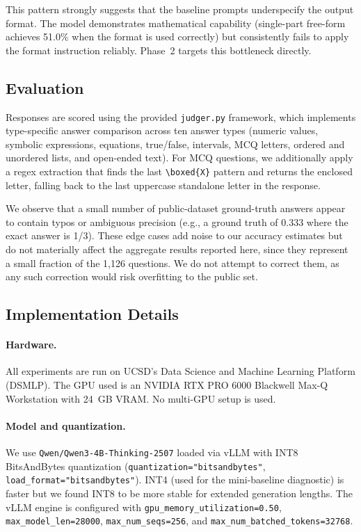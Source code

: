 \documentclass{article}
\begin{document}
This pattern strongly suggests that the baseline prompts underspecify the output format. The model demonstrates mathematical capability (single-part free-form achieves 51.0\% when the format is used correctly) but consistently fails to apply the format instruction reliably. Phase~2 targets this bottleneck directly.


\subsection{Evaluation}
\label{sec:evaluation}

Responses are scored using the provided \texttt{judger.py} framework, which implements type-specific answer comparison across ten answer types (numeric values, symbolic expressions, equations, true/false, intervals, MCQ letters, ordered and unordered lists, and open-ended text). For MCQ questions, we additionally apply a regex extraction that finds the last \texttt{\textbackslash boxed\{X\}} pattern and returns the enclosed letter, falling back to the last uppercase standalone letter in the response.

We observe that a small number of public-dataset ground-truth answers appear to contain typos or ambiguous precision (e.g., a ground truth of 0.333 where the exact answer is 1/3). These edge cases add noise to our accuracy estimates but do not materially affect the aggregate results reported here, since they represent a small fraction of the 1,126 questions. We do not attempt to correct them, as any such correction would risk overfitting to the public set.

\subsection{Implementation Details}
\label{sec:implementation_details}

\paragraph{Hardware.} All experiments are run on UCSD's Data Science and Machine Learning Platform (DSMLP). The GPU used is an NVIDIA RTX PRO 6000 Blackwell Max-Q Workstation with 24~GB VRAM. No multi-GPU setup is used.

\paragraph{Model and quantization.} We use \texttt{Qwen/Qwen3-4B-Thinking-2507} loaded via vLLM with INT8 BitsAndBytes quantization (\texttt{quantization="bitsandbytes"}, \texttt{load\_format="bitsandbytes"}). INT4 (used for the mini-baseline diagnostic) is faster but we found INT8 to be more stable for extended generation lengths. The vLLM engine is configured with \texttt{gpu\_memory\_utilization=0.50}, \texttt{max\_model\_len=28000}, \texttt{max\_num\_seqs=256}, and \texttt{max\_num\_batched\_tokens=32768}.
\end{document}
